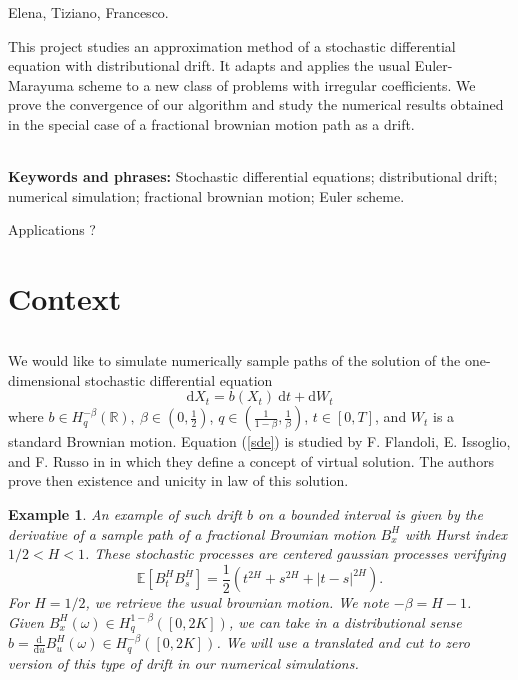 \documentclass[11pt]{enstaPRE}
\newtheorem{ex}{Example}
\newcommand{\de}[2]{\frac{\mathrm{d} #1}{\mathrm{d} #2}}
\newcommand{\R}{\mathbb{R}}
\newcommand{\E}{\mathbb{E}}
\newcommand{\di}{\mathrm{d}}
\begin{document}
\couverture



Elena, Tiziano, Francesco.

This project studies an approximation method of a stochastic differential equation with distributional drift. It adapts and applies the usual Euler-Marayuma scheme to a new class of problems with irregular coefficients. We prove the convergence of our algorithm and study the numerical results obtained in the special case of a fractional brownian motion path as a drift.

\paragraph{}
\textbf{Keywords and phrases:} Stochastic differential equations; distributional drift; numerical simulation; fractional brownian motion; Euler scheme.

\tableofcontents


Applications ?

\part{Context}
    \paragraph{}
    We would like to simulate numerically sample paths of the solution of the one-dimensional stochastic differential equation
    \begin{equation} \label{sde}
    \di X_t = b(X_t)\ \di t + \di W_t
    \end{equation}
    where $b\in H^{-\beta}_q(\R),\ \beta\in\left(0,\frac{1}{2}\right)$, $q\in\left(\frac{1}{1-\beta},\frac{1}{\beta}\right)$, $t\in[0,T]$, and $W_t$ is a standard Brownian motion. Equation (\ref{sde}) is studied by F. Flandoli, E. Issoglio, and F. Russo in \cite{Fla-Iss-Rus-2017} in which they define a concept of virtual solution. The authors prove then existence and unicity in law of this solution. 
    
    \begin{ex}
        An example of such drift $b$ on a bounded interval is given by the derivative of a sample path of a fractional Brownian motion $B^H_x$ with Hurst index $1/2<H<1$. These stochastic processes are centered gaussian processes verifying $$\E\left[B_t^HB_s^H\right]=\frac{1}{2}\left(t^{2H}+s^{2H}+|t-s|^{2H}\right).$$ For $H=1/2$, we retrieve the usual brownian motion. We note $-\beta = H - 1$. Given $B^H_x(\omega)\in H^{1-\beta}_q([0,2K])$, we can take in a distributional sense $b = \de{}{u}B^H_u(\omega)\in H^{-\beta}_q([0,2K])$. We will use a translated and cut to zero version of this type of drift in our numerical simulations.
    \end{ex}    
\end{document}
